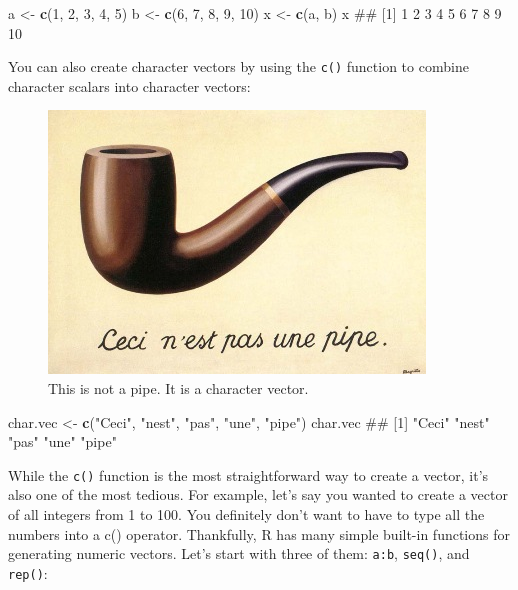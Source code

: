 \documentclass[]{book}
\newenvironment{Shaded}{\begin{snugshade}}{\end{snugshade}}
\newcommand{\KeywordTok}[1]{\textcolor[rgb]{0.13,0.29,0.53}{\textbf{#1}}}
\newcommand{\DecValTok}[1]{\textcolor[rgb]{0.00,0.00,0.81}{#1}}
\newcommand{\StringTok}[1]{\textcolor[rgb]{0.31,0.60,0.02}{#1}}
\newcommand{\NormalTok}[1]{#1}
\theoremstyle{definition}
\theoremstyle{definition}
\theoremstyle{remark}
\begin{document}
\begin{Shaded}
\begin{Highlighting}[]
\NormalTok{a <-}\StringTok{ }\KeywordTok{c}\NormalTok{(}\DecValTok{1}\NormalTok{, }\DecValTok{2}\NormalTok{, }\DecValTok{3}\NormalTok{, }\DecValTok{4}\NormalTok{, }\DecValTok{5}\NormalTok{)}
\NormalTok{b <-}\StringTok{ }\KeywordTok{c}\NormalTok{(}\DecValTok{6}\NormalTok{, }\DecValTok{7}\NormalTok{, }\DecValTok{8}\NormalTok{, }\DecValTok{9}\NormalTok{, }\DecValTok{10}\NormalTok{)}
\NormalTok{x <-}\StringTok{ }\KeywordTok{c}\NormalTok{(a, b)}
\NormalTok{x}
\NormalTok{##  [1]  1  2  3  4  5  6  7  8  9 10}
\end{Highlighting}
\end{Shaded}

You can also create character vectors by using the \texttt{c()} function
to combine character scalars into character vectors:

\begin{figure}

{\centering \includegraphics[width=0.5\linewidth]{images/magrittepipe} 

}

\caption{This is not a pipe. It is a character vector.}\label{fig:unnamed-chunk-86}
\end{figure}

\begin{Shaded}
\begin{Highlighting}[]
\NormalTok{char.vec <-}\StringTok{ }\KeywordTok{c}\NormalTok{(}\StringTok{"Ceci"}\NormalTok{, }\StringTok{"nest"}\NormalTok{, }\StringTok{"pas"}\NormalTok{, }\StringTok{"une"}\NormalTok{, }\StringTok{"pipe"}\NormalTok{)}
\NormalTok{char.vec}
\NormalTok{## [1] "Ceci" "nest" "pas"  "une"  "pipe"}
\end{Highlighting}
\end{Shaded}

While the \texttt{c()} function is the most straightforward way to
create a vector, it's also one of the most tedious. For example, let's
say you wanted to create a vector of all integers from 1 to 100. You
definitely don't want to have to type all the numbers into a c()
operator. Thankfully, R has many simple built-in functions for
generating numeric vectors. Let's start with three of them:
\texttt{a:b}, \texttt{seq()}, and \texttt{rep()}:
\end{document}
